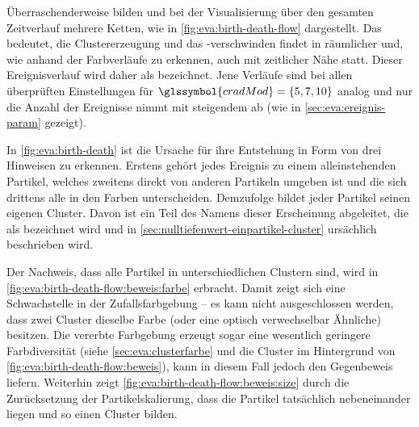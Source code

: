 Überraschenderweise bilden  und  bei der Visualisierung über den gesamten Zeitverlauf mehrere Ketten, wie in \autoref{fig:eva:birth-death-flow} dargestellt. Das bedeutet, die Clustererzeugung und das -verschwinden findet in räumlicher und, wie anhand der Farbverläufe zu erkennen, auch mit zeitlicher Nähe statt.  Dieser Ereignisverlauf wird daher als  bezeichnet. Jene Verläufe sind bei allen überprüften Einstellungen für $\glssymbol{cradMod} = \{5,7,10\}$ analog und nur die Anzahl der Ereignisse nimmt mit steigendem  ab (wie in \autoref{sec:eva:ereignis-param} gezeigt).

In \autoref{fig:eva:birth-death} ist die Ursache für ihre Entstehung in Form von drei Hinweisen zu erkennen. Erstens gehört jedes Ereignis zu einem alleinstehenden Partikel, welches zweitens direkt von anderen Partikeln umgeben ist und die sich drittens alle in den Farben unterscheiden. Demzufolge bildet jeder Partikel seinen eigenen Cluster. Davon ist ein Teil des Namens dieser Erscheinung abgeleitet, die als  bezeichnet wird und in \autoref{sec:nulltiefenwert-einpartikel-cluster} ursächlich beschrieben wird.

Der Nachweis, dass alle Partikel in unterschiedlichen Clustern sind, wird in \autoref{fig:eva:birth-death-flow:beweis:farbe} erbracht. Damit zeigt sich eine Schwachstelle in der Zufallsfarbgebung -- es kann nicht ausgeschlossen werden, dass zwei Cluster dieselbe Farbe (oder eine optisch verwechselbar Ähnliche) besitzen. Die vererbte Farbgebung erzeugt sogar eine wesentlich geringere Farbdiversität (siehe \autoref{sec:eva:clusterfarbe} und die Cluster im Hintergrund von \autoref{fig:eva:birth-death-flow:beweis}), kann in diesem Fall jedoch den Gegenbeweis liefern. Weiterhin zeigt \autoref{fig:eva:birth-death-flow:beweis:size} durch die Zurücksetzung der Partikelskalierung, dass die Partikel tatsächlich nebeneinander liegen und so einen Cluster bilden.


